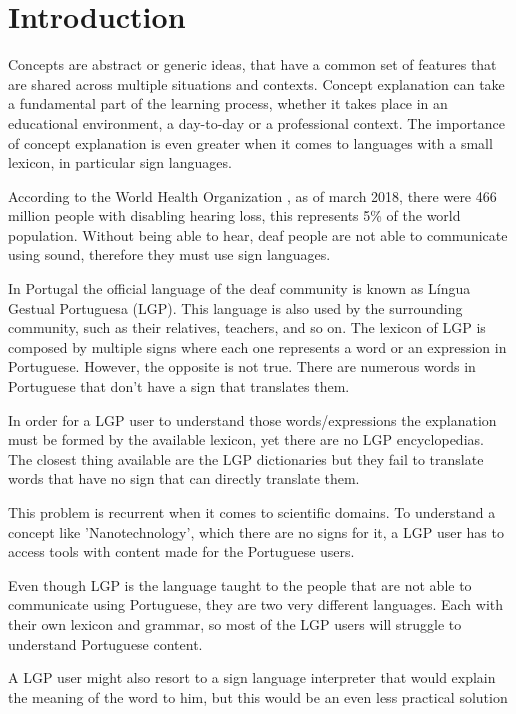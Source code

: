 \documentclass[runningheads]{llncs}
\begin{document}
\section{Introduction}

Concepts are abstract or generic ideas, that have a common set of features that are shared across multiple situations and contexts.
Concept explanation can take a fundamental part of the learning process\cite{conceptExp}, whether it takes place in an educational environment, a day-to-day or a professional context.
The importance of concept explanation is even greater when it comes to languages with a small lexicon, in particular sign languages.

According to the World Health Organization \cite{who_2020}, as of march 2018, there were 466 million people with disabling hearing loss, this represents 5\% of the world population.
Without being able to hear, deaf people are not able to communicate using sound, therefore they must use sign languages.

In Portugal the official language of the deaf community is known as Língua Gestual Portuguesa (LGP).
This language is also used by the surrounding community, such as their relatives, teachers, and so on.
The lexicon of LGP is composed by multiple signs where each one represents a word or an expression in Portuguese.
However, the opposite is not true.
There are numerous words in Portuguese that don't have a sign that translates them.

In order for a LGP user to understand those words/expressions the explanation must be formed by the available lexicon\cite{deafness}, yet there are no LGP encyclopedias.
The closest thing available are the LGP dictionaries but they fail to translate words that have no sign that can directly translate them.

This problem is recurrent when it comes to scientific domains.
To understand a concept like 'Nanotechnology', which there are no signs for it, a LGP user has to access tools with content made for the Portuguese users.

Even though LGP is the language taught to the people that are not able to communicate using Portuguese, they are two very different languages.
Each with their own lexicon and grammar, so most of the LGP users will struggle to understand Portuguese content.

A LGP user might also resort to a sign language interpreter that would explain the meaning of the word to him, but this would be an even less practical solution
\end{document}
